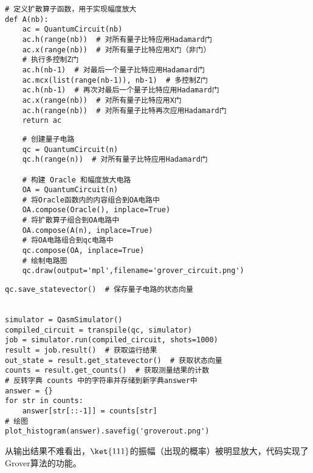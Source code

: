 
\begin{py}
\begin{lstlisting}
# 定义扩散算子函数，用于实现幅度放大
def A(nb): 
    ac = QuantumCircuit(nb)
    ac.h(range(nb))  # 对所有量子比特应用Hadamard门
    ac.x(range(nb))  # 对所有量子比特应用X门（非门）
    # 执行多控制Z门
    ac.h(nb-1)  # 对最后一个量子比特应用Hadamard门
    ac.mcx(list(range(nb-1)), nb-1)  # 多控制Z门
    ac.h(nb-1)  # 再次对最后一个量子比特应用Hadamard门
    ac.x(range(nb))  # 对所有量子比特应用X门
    ac.h(range(nb))  # 对所有量子比特再次应用Hadamard门
    return ac
\end{lstlisting}
\end{py}

\begin{py}
\begin{lstlisting}
    # 创建量子电路
    qc = QuantumCircuit(n)
    qc.h(range(n))  # 对所有量子比特应用Hadamard门
    
    # 构建 Oracle 和幅度放大电路
    OA = QuantumCircuit(n)
    # 将Oracle函数内的内容组合到OA电路中
    OA.compose(Oracle(), inplace=True)  
    # 将扩散算子组合到OA电路中
    OA.compose(A(n), inplace=True)  
    # 将OA电路组合到qc电路中
    qc.compose(OA, inplace=True)     
    # 绘制电路图
    qc.draw(output='mpl',filename='grover_circuit.png')
\end{lstlisting}
\end{py}

\begin{py}
\begin{lstlisting}
qc.save_statevector()  # 保存量子电路的状态向量


simulator = QasmSimulator()
compiled_circuit = transpile(qc, simulator)
job = simulator.run(compiled_circuit, shots=1000)
result = job.result()  # 获取运行结果
out_state = result.get_statevector()  # 获取状态向量
counts = result.get_counts()  # 获取测量结果的计数
# 反转字典 counts 中的字符串并存储到新字典answer中
answer = {}
for str in counts:
    answer[str[::-1]] = counts[str]  
# 绘图
plot_histogram(answer).savefig('groverout.png') 
\end{lstlisting}
\end{py}
从输出结果不难看出，$\ket{111}$的振幅（出现的概率）被明显放大，代码实现了Grover算法的功能。
